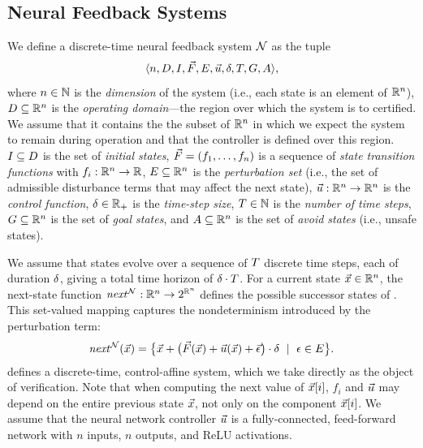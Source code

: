 \documentclass[letterpaper, 10 pt, conference]{ieeeconf}  %
\begin{document}
\subsection{Neural Feedback Systems}
We define a discrete-time neural feedback system $\mathcal{N}$ as the tuple
\[
\langle n, D, I, \vec{F}, E, \vec{u}, \delta, T, G, A \rangle,
\]
where $n \in \mathbb{N}$ is the \emph{dimension} of the system (i.e., each state is
an element of $\mathbb{R}^n$), $D \subseteq \mathbb{R}^n$ is the \emph{operating
domain}---the region over which the system is to certified. We assume that it contains the
the subset of $\mathbb{R}^n$ in which we expect the system to remain during
operation and that the controller is defined over this region. 
$I \subseteq D$ is the set of \emph{initial states}, 
$\vec{F} = (f_1, \dots, f_n)$ is a sequence of \emph{state transition functions} with $f_i : \mathbb{R}^n \to \mathbb{R}$, 
$E \subseteq \mathbb{R}^n$ is the \emph{perturbation set} (i.e., the set of admissible disturbance terms that may affect the next state), 
$\vec{u} : \mathbb{R}^n \to \mathbb{R}^n$ is the \emph{control function}, 
$\delta \in \mathbb{R}_+$ is the \emph{time-step size}, 
$T \in \mathbb{N}$ is the \emph{number of time steps}, 
$G \subseteq \mathbb{R}^n$ is the set of \emph{goal states}, 
and $A \subseteq \mathbb{R}^n$ is the set of \emph{avoid states} (i.e., unsafe states).


We assume that states evolve over a sequence of $T$ discrete time steps, each of duration $\delta$, giving a total time horizon of $\delta \cdot T$. 
For a current state $\vec{x} \in \mathbb{R}^n$, the next-state function $\mathit{next}^{\mathcal{N}} : \mathbb{R}^n \to 2^{\mathbb{R}^n}$ defines the possible successor states of \dynsys. 
This set-valued mapping captures the nondeterminism introduced by the perturbation term:
\begin{align}
    \mathit{next}^{\mathcal{N}}(\vec{x}) 
    = \big\{ \vec{x} + \big(\vec{F}(\vec{x}) + \vec{u}(\vec{x}) + \vec{\epsilon}\big) \cdot \delta\ \mid\ \epsilon\in E\big\}.
    \label{eq:fwd_diffEq}
\end{align}
 defines a discrete-time, control-affine system, which we take directly as the object of verification.
Note that when computing the next value of $\vec{x}[i]$, $f_i$ and $\vec{u}$ may depend on the entire previous state $\vec{x}$, not only on the component $\vec{x}[i]$.
We assume that the neural network controller $\vec{u}$ is a fully-connected, feed-forward network with $n$ inputs, $n$ outputs, and ReLU activations.
\end{document}
